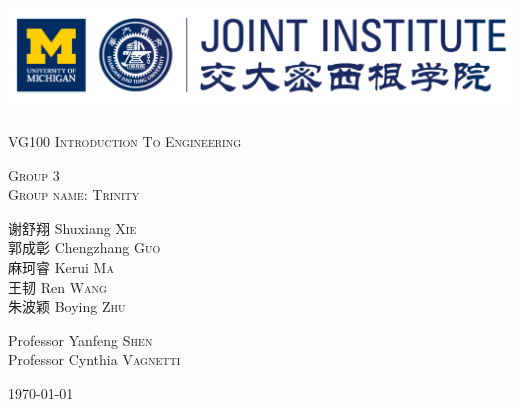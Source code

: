 
\begin{center}
\vspace*{0.7in}
\vspace*{0.7in}






\begin{center} 

\includegraphics[height=3cm]{picture/umjiLogo}


{
\linespread{2}
\huge
\textsc{VG100 Introduction To Engineering} \\
}

\vspace*{0.7in}
\textsc{Group 3}\\
\textsc{Group name: Trinity}\\
\vspace*{0.7in}

{\selectfont 谢舒翔} Shuxiang \textsc{Xie} \\
{\selectfont 郭成彰} Chengzhang \textsc{Guo} \\
{\selectfont 麻珂睿} Kerui \textsc{Ma} \\
{\selectfont 王韧} Ren \textsc{Wang} \\
{\selectfont 朱波颖} Boying \textsc{Zhu} \\




\vspace*{0.7in}

Professor \phantom{iia}  Yanfeng \textsc{Shen} \phantom{i}\\
Professor \phantom{a} Cynthia \textsc{Vagnetti} 


{\today}


\end{center}



\end{center}
\newpage
